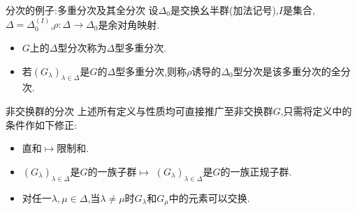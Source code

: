 \begin{definition}{分次的例子:多重分次及其全分次}{}
	设$\Delta_{0}$是交换幺半群(加法记号),$I$是集合,$\Delta=\Delta_{0}^{\left(I\right)}$,$\rho:\Delta\to\Delta_{0}$是余对角映射.
	\begin{itemize}
		\item $G$上的$\Delta$型分次称为$\Delta$型多重分次.
		\item 若$\left(G_{\lambda}\right)_{\lambda\in\Delta}$是$G$的$\Delta$型多重分次,则称$\rho$诱导的$\Delta_{0}$型分次是该多重分次的全分次.
	\end{itemize}	
\end{definition}

\begin{remark}{非交换群的分次}{}
	上述所有定义与性质均可直接推广至非交换群$G$,只需将定义中的条件作如下修正:
	\begin{itemize}
		\item 直和$\mapsto$限制和.
		\item $\left(G_{\lambda}\right)_{\lambda\in\Delta}$是$G$的一族子群$\mapsto$ $\left(G_{\lambda}\right)_{\lambda\in\Delta}$是$G$的一族正规子群.
		\item 对任一$\lambda,\mu\in\Delta$,当$\lambda\neq\mu$时$G_{\lambda}$和$G_{\mu}$中的元素可以交换.
	\end{itemize}
\end{remark}
